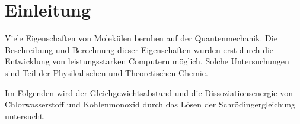 %
%

\section{Einleitung}


Viele Eigenschaften von Molekülen beruhen auf der Quantenmechanik. Die Beschreibung und Berechnung dieser Eigenschaften wurden erst durch die Entwicklung von leistungsstarken Computern möglich. Solche Untersuchungen sind Teil der Physikalischen und Theoretischen Chemie.

Im Folgenden wird der Gleichgewichtsabstand und die Dissoziationsenergie von Chlorwasserstoff und Kohlenmonoxid durch das Lösen der Schrödingergleichung untersucht.








%

